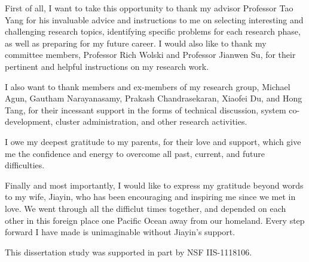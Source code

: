 \begin{acknowledgements}

First of all, I want to take this opportunity to thank my advisor Professor Tao Yang for 
his invaluable advice and instructions to me on selecting interesting and challenging
research topics, identifying specific problems for each research phase, 
as well as preparing for my future career. I would also like to thank my committee
members, Professor Rich Wolski and Professor Jianwen Su, for their pertinent and helpful
instructions on my research work. 

I also want to thank members and ex-members of my research group, Michael Agun, Gautham Narayanasamy,
Prakash Chandrasekaran, Xiaofei Du, and Hong Tang, 
for their incessant support in the forms of technical discussion, 
system co-development, cluster administration, and other research activities.

I owe my deepest gratitude to my parents, for their love and support, which give 
me the confidence and energy to overcome all past, current, and future difficulties. 

Finally and most importantly, I would like to express my gratitude beyond 
words to my wife, Jiayin, who has been encouraging and inspiring me 
since we met in love. We went through all the difficlut times together,
and depended on each other in this foreign place one Pacific Ocean away from our homeland.
Every step forward I have made is unimaginable without Jiayin's support.

This dissertation study was supported in part by NSF IIS-1118106.
\end{acknowledgements}
